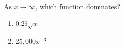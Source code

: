 \bigskip

\item As $x \rightarrow \infty$, which function dominates?

\begin{enumerate}
\item $0.25 \sqrt{x}$
\item $25,000 x^{-3}$
\end{enumerate}

